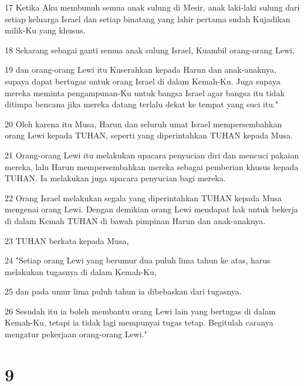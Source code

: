 \par 17 Ketika Aku membunuh semua anak sulung di Mesir, anak laki-laki sulung dari setiap keluarga Israel dan setiap binatang yang lahir pertama sudah Kujadikan milik-Ku yang khusus.
\par 18 Sekarang sebagai ganti semua anak sulung Israel, Kuambil orang-orang Lewi,
\par 19 dan orang-orang Lewi itu Kuserahkan kepada Harun dan anak-anaknya, supaya dapat bertugas untuk orang Israel di dalam Kemah-Ku. Juga supaya mereka meminta pengampunan-Ku untuk bangsa Israel agar bangsa itu tidak ditimpa bencana jika mereka datang terlalu dekat ke tempat yang suci itu."
\par 20 Oleh karena itu Musa, Harun dan seluruh umat Israel mempersembahkan orang Lewi kepada TUHAN, seperti yang diperintahkan TUHAN kepada Musa.
\par 21 Orang-orang Lewi itu melakukan upacara penyucian diri dan mencuci pakaian mereka, lalu Harun mempersembahkan mereka sebagai pemberian khusus kepada TUHAN. Ia melakukan juga upacara penyucian bagi mereka.
\par 22 Orang Israel melakukan segala yang diperintahkan TUHAN kepada Musa mengenai orang Lewi. Dengan demikian orang Lewi mendapat hak untuk bekerja di dalam Kemah TUHAN di bawah pimpinan Harun dan anak-anaknya.
\par 23 TUHAN berkata kepada Musa,
\par 24 "Setiap orang Lewi yang berumur dua puluh lima tahun ke atas, harus melakukan tugasnya di dalam Kemah-Ku,
\par 25 dan pada umur lima puluh tahun ia dibebaskan dari tugasnya.
\par 26 Sesudah itu ia boleh membantu orang Lewi lain yang bertugas di dalam Kemah-Ku, tetapi ia tidak lagi mempunyai tugas tetap. Begitulah caranya mengatur pekerjaan orang-orang Lewi."

\chapter{9}

